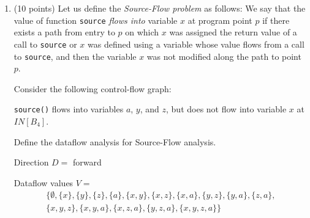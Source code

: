 \documentclass[12pt]{article}
\begin{document}
\begin{enumerate}
      \clearpage
      \item (10 points)
      Let us define the \emph{Source-Flow problem} as follows:
      We say that the value of function \lstinline$source$ \emph{flows into} variable $x$ at program point $p$ if
      there exists a path from entry to $p$ on which $x$ was assigned the return value of a call to \lstinline$source$
      or $x$ was defined using a variable whose value flows from a call to \lstinline$source$,
      and then the variable $x$ was not modified along the path to point $p$.

      Consider the following control-flow graph:

      \begin{center}
    \end{center}

      \lstinline$source()$ flows into variables $a$, $y$, and $z$, but does not
      flow into variable $x$ at $IN[B_4]$.

      Define the dataflow analysis for Source-Flow analysis.

      \begin{mdframed}
        Direction $D =$  forward

        Dataflow values $V = $ 
   \begin{multline*}
    \{
    \emptyset, \{x\}, \{y\}, \{z\}, \{a\}, 
    \{x,y\}, \{x,z\}, \{x,a\}, \{y,z\}, \{y,a\}, \{z,a\}, \\
    \{x,y,z\}, \{x,y,a\}, \{x,z,a\}, \{y,z,a\}, 
    \{x,y,z,a\}
    \}
    \end{multline*}


\end{mdframed}
\end{enumerate}
\end{document}
